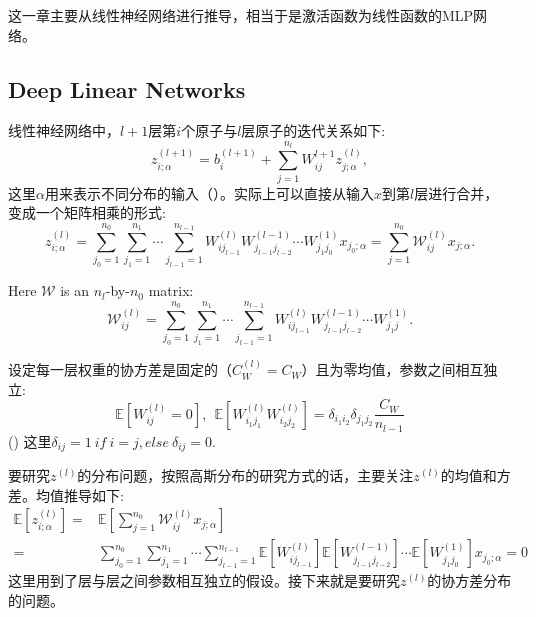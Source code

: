这一章主要从线性神经网络进行推导，相当于是激活函数为线性函数的MLP网络。

\subsection{Deep Linear Networks}

线性神经网络中，$l+1$层第$i$个原子与$l$层原子的迭代关系如下:
\begin{equation}
    z_{i;\alpha}^{(l+1)} = b_i^{(l+1)} + \sum_{j=1}^{n_l} W_{ij}^{l+1}z_{j;\alpha}^{(l)},
\end{equation}
这里$\alpha$用来表示不同分布的输入（）。实际上可以直接从输入$x$到第$l$层进行合并，变成一个矩阵相乘的形式:
\begin{equation}
    z_{i;\alpha}^{(l)} = \sum_{j_0=1}^{n_0}\sum_{j_1=1}^{n_1} \cdots \sum_{j_{l-1}=1}^{n_{l-1}}
                W_{ij_{l-1}}^{(l)} W_{j_{l-1}j_{l-2}}^{(l-1)} \cdots W_{j_1j_0}^{(1)} x_{j_0;\alpha}
              = \sum_{j=1}^{n_0} \mathcal{W}_{ij}^{(l)} x_{j;\alpha}.
\end{equation}

Here $\mathcal{W}$ is an $n_l$-by-$n_0$ matrix:
\begin{equation}
    \mathcal{W}_{ij}^{(l)} = \sum_{j_0=1}^{n_0}\sum_{j_1=1}^{n_1} \cdots \sum_{j_{l-1}=1}^{n_{l-1}}
                W_{ij_{l-1}}^{(l)} W_{j_{l-1}j_{l-2}}^{(l-1)} \cdots W_{j_1j}^{(1)}.
\end{equation}

设定每一层权重的协方差是固定的（$C_W^{(l)} = C_W$）且为零均值，参数之间相互独立:
\begin{equation}
    \mathbb{E}[W_{ij}^{(l)} = 0], ~~ \mathbb{E}[W_{i_1j_1}^{(l)}W_{i_2j_2}^{(l)}] 
                                    = \delta_{i_1i_2}\delta_{j_1j_2}\frac{C_W}{n_{l-1}}
    \label{eq:expectation}
\end{equation}
() 这里$\delta_{ij} = 1 ~ if ~ i=j, else ~ \delta_{ij} = 0$.

要研究$z^{(l)}$的分布问题，按照高斯分布的研究方式的话，主要关注$z^{(l)}$的均值和方差。均值推导如下:
\begin{equation}
    \begin{aligned}
    \mathbb{E}[z_{i;\alpha}^{(l)}] =& \mathbb{E}[\sum_{j=1}^{n_0} \mathcal{W}_{ij}^{(l)} x_{j;\alpha}] \\
     =& \sum_{j_0=1}^{n_0}\sum_{j_1=1}^{n_1} \cdots \sum_{j_{l-1}=1}^{n_{l-1}}
       \mathbb{E}[W_{ij_{l-1}}^{(l)}] \mathbb{E}[W_{j_{l-1}j_{l-2}}^{(l-1)}]
       \cdots \mathbb{E}[W_{j_1j_0}^{(1)}] x_{j_0;\alpha} = 0
    \end{aligned}
\end{equation}
这里用到了层与层之间参数相互独立的假设。接下来就是要研究$z^{(l)}$的协方差分布的问题。

